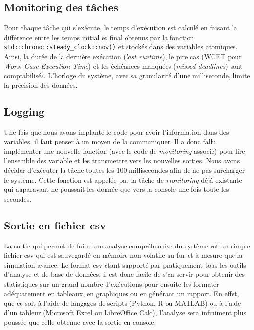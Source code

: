 \documentclass[journal]{IEEEtran}
\begin{document}
\subsection{Monitoring des tâches}

Pour chaque tâche qui s'exécute, le temps d'exécution est calculé en faisant la différence entre les temps initial et final obtenus par la fonction \verb|std::chrono::steady_clock::now()| et stockés dans des variables atomiques. Ainsi, la durée de la dernière exécution (\textit{last runtime}), le pire cas (WCET pour \textit{Worst-Case Execution Time}) et les échéances manquées (\textit{missed deadlines}) sont comptabilisés. L'horloge du système, avec sa granularité d'une milliseconde, limite la précision des données.

\subsection{Logging}

Une fois que nous avons implanté le code pour avoir l'information dans des variables, il faut penser à un moyen de la communiquer. Il a donc fallu implémenter une nouvelle fonction (avec le code de \textit{monitoring} associé) pour lire l'ensemble des variable et les transmettre vers les nouvelles sorties. Nous avons décider d'exécuter la tâche toutes les 100 millisecondes afin de ne pas surcharger le système. Cette fonction est appelée par la tâche de \textit{monitoring} déjà existante qui auparavant ne poussait les donnée que vers la console une fois toute les secondes.

\subsection{Sortie en fichier csv}

La sortie qui permet de faire une analyse compréhensive du système est un simple fichier csv qui est sauvegardé en mémoire non-volatile au fur et à mesure que la simulation avance. Le format csv étant supporté par pratiquement tous les outils d'analyse et de base de données, il est donc facile de s'en servir pour obtenir des statistiques sur un grand nombre d'exécutions pour ensuite les formater adéquatement en tableaux, en graphiques ou en générant un rapport. En effet, que ce soit à l'aide de langages de scripts (Python, R ou MATLAB) ou à l'aide d'un tableur (Microsoft Excel ou LibreOffice Calc), l'analyse sera infiniment plus poussée que celle obtenue avec la sortie en console.
 
\end{document}
